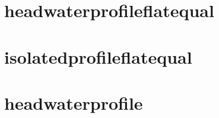 \section{headwaterprofileflatequal}
\def\headwaterprofileflatequal[#1]#2{
\begin{tikzpicture}[scale = #1]
  \draw [fill=#2, ultra thick] (1.8,-.3) rectangle (3.2,0.1);
\draw
  [fill=#2,
  ultra thick
  ] 
  (0,0) circle (2cm and 0.5cm);
\clip (-2,-3) rectangle (2,0);
\draw
  [fill=#2,
  ultra thick
  ] 
  (2,0) {[rounded corners=45pt] -- (0,-3)} -- (-2,0) arc (180:360:2cm and 0.5cm);

\end{tikzpicture}
}

\section{isolatedprofileflatequal}
\def\isolatedprofileflatequal[#1]#2{
\begin{tikzpicture}[scale = #1]
\draw
  [fill=#2,
  ultra thick
  ] 
  (0,0) circle (2cm and 0.5cm);
\clip (-2,-3) rectangle (2,0);
\draw
  [fill=#2,
  ultra thick
  ] 
  (2,0) {[rounded corners=45pt] -- (0,-3)} -- (-2,0) arc (180:360:2cm and 0.5cm);

\end{tikzpicture}
}

\section{headwaterprofile}
\def\headwaterprofile[#1]#2{
\begin{tikzpicture}[scale = #1]
  \draw [-,line width = 5, #2!100!black] (1.95,0) to [out=0,in=180] (2.7,0);
\fill[
  top color=#2!100,
  bottom color=#2!40,
  shading=axis,
  opacity=0.45
  ] 
  (0,0) circle (2cm and 0.5cm);
\fill[
  left color=#2!50!black,
  right color=#2!50!black,
  middle color=#2!100,
  shading=axis,
  opacity=0.25
  ] 
  (2,0) {[rounded corners=45pt] -- (0,-3)} -- (-2,0) arc (180:360:2cm and 0.5cm);
\end{tikzpicture}
}

